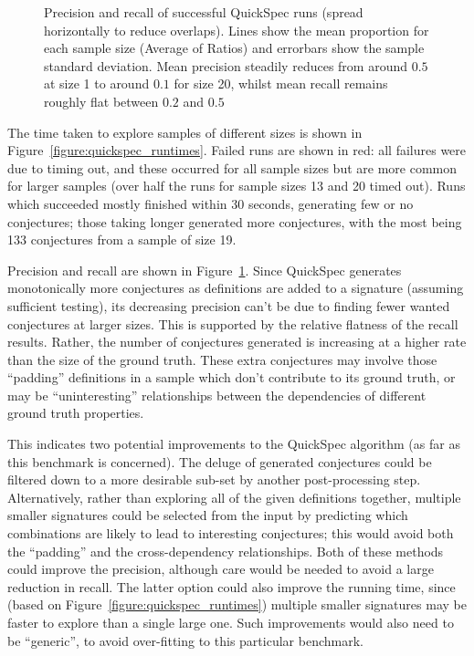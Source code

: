 \begin{figure}
  \centering
  
  \caption{Precision and recall of successful QuickSpec runs (spread
    horizontally to reduce overlaps). Lines show the mean proportion for each
    sample size (Average of Ratios) and errorbars show the sample standard
    deviation. Mean precision steadily reduces from around $0.5$ at size 1 to
    around $0.1$ for size 20, whilst mean recall remains roughly flat between
    $0.2$ and $0.5$}
  \label{figure:quickspec_precRec}
\end{figure}

The time taken to explore samples of different sizes is shown in
Figure~\ref{figure:quickspec_runtimes}. Failed runs are shown in red: all
failures were due to timing out, and these occurred for all sample sizes but are
more common for larger samples (over half the runs for sample sizes 13 and 20
timed out). Runs which succeeded mostly finished within 30 seconds, generating
few or no conjectures; those taking longer generated more conjectures, with the
most being 133 conjectures from a sample of size 19.

Precision and recall are shown in Figure~\ref{figure:quickspec_precRec}.
Since QuickSpec generates monotonically more conjectures as definitions are
added to a signature (assuming sufficient testing), its decreasing precision
can't be due to finding fewer wanted conjectures at larger sizes. This is
supported by the relative flatness of the recall results. Rather, the number of
conjectures generated is increasing at a higher rate than the size of the ground
truth. These extra conjectures may involve those ``padding'' definitions in a
sample which don't contribute to its ground truth, or may be ``uninteresting''
relationships between the dependencies of different ground truth properties.

This indicates two potential improvements to the QuickSpec algorithm (as far as
this benchmark is concerned). The deluge of generated conjectures could be
filtered down to a more desirable sub-set by another post-processing step.
Alternatively, rather than exploring all of the given definitions together,
multiple smaller signatures could be selected from the input by predicting which
combinations are likely to lead to interesting conjectures; this would avoid
both the ``padding'' and the cross-dependency relationships. Both of these
methods could improve the precision, although care would be needed to avoid a
large reduction in recall. The latter option could also improve the running
time, since (based on Figure~\ref{figure:quickspec_runtimes}) multiple smaller
signatures may be faster to explore than a single large one. Such improvements
would also need to be ``generic'', to avoid over-fitting to this particular
benchmark.

